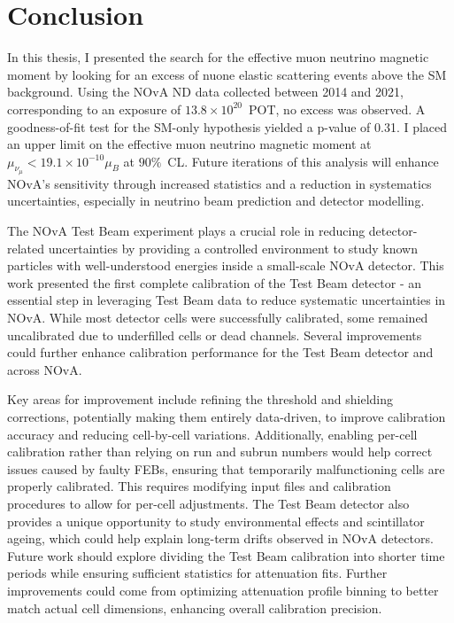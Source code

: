 \chapter{Conclusion}\label{sec:Conclusion}

In this thesis, I presented the search for the effective muon neutrino magnetic moment by looking for an excess of \gls{nuone} elastic scattering events above the \gls{SM} background. Using the \gls{NOvA} \gls{ND} data collected between 2014 and 2021, corresponding to an exposure of $13.8\times10^{20}$~\gls{POT}, no excess was observed. A goodness-of-fit test for the \gls{SM}-only hypothesis yielded a p-value of 0.31. I placed an upper limit on the effective muon neutrino magnetic moment at $\mu_{\nu_\mu}<19.1\times 10^{-10}\mu_B$ at $90\%$~\gls{CL}. Future iterations of this analysis will enhance \gls{NOvA}'s sensitivity through increased statistics and a reduction in systematics uncertainties, especially in neutrino beam prediction and detector modelling.

The \gls{NOvA} Test Beam experiment plays a crucial role in reducing detector-related uncertainties by providing a controlled environment to study known particles with well-understood energies inside a small-scale \gls{NOvA} detector. This work presented the first complete calibration of the Test Beam detector - an essential step in leveraging Test Beam data to reduce systematic uncertainties in \gls{NOvA}. While most detector cells were successfully calibrated, some remained uncalibrated due to underfilled cells or dead channels. Several improvements could further enhance calibration performance for the Test Beam detector and across \gls{NOvA}.

Key areas for improvement include refining the threshold and shielding corrections, potentially making them entirely data-driven, to improve calibration accuracy and reducing cell-by-cell variations. Additionally, enabling per-cell calibration rather than relying on run and subrun numbers would help correct issues caused by faulty \glspl{FEB}, ensuring that temporarily malfunctioning cells are properly calibrated. This requires modifying input files and calibration procedures to allow for per-cell adjustments. The Test Beam detector also provides a unique opportunity to study environmental effects and scintillator ageing, which could help explain long-term drifts observed in \gls{NOvA} detectors. Future work should explore dividing the Test Beam calibration into shorter time periods while ensuring sufficient statistics for attenuation fits. Further improvements could come from optimizing attenuation profile binning to better match actual cell dimensions, enhancing overall calibration precision.


